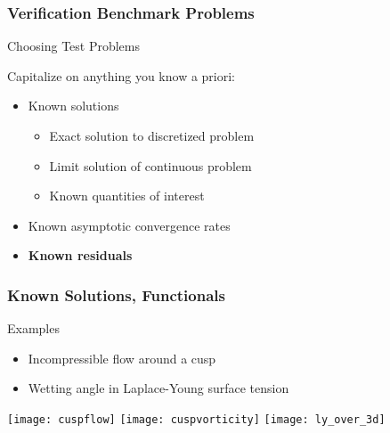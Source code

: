 \begin{frame}
\frametitle{Verification Benchmark Problems}
\begin{block}{Choosing Test Problems}

Capitalize on anything you know a priori:

\begin{itemize}
\item Known solutions
\begin{itemize}
\item Exact solution to discretized problem
\item Limit solution of continuous problem
\item Known quantities of interest
\end{itemize}
\item Known asymptotic convergence rates
\item {\bf Known residuals}
\end{itemize}
\end{block}
\end{frame}

\begin{frame}
\frametitle{Known Solutions, Functionals}
\begin{block}{Examples}
\begin{itemize}
\item Incompressible flow around a cusp
\item Wetting angle in Laplace-Young surface tension
\end{itemize}
\end{block}

\texttt{[image: cuspflow]}
\texttt{[image: cuspvorticity]}
\texttt{[image: ly\_over\_3d]}

\end{frame}

